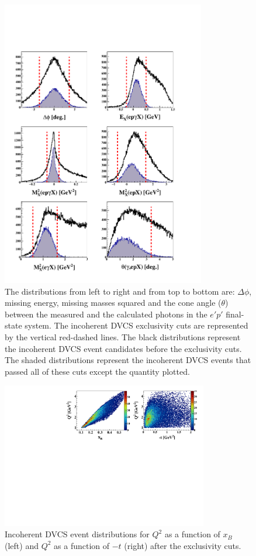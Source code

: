 \documentclass[twocolumn,nofootinbib,showpacs,prl,superscriptaddress,secnumarabic,amssymb,nobibnotes,aps,floatfix]{revtex4}
\begin{document}
\begin{figure}[tb]
\includegraphics[width=8.9cm]{figs/incoh_exc_cuts_final.pdf}
\caption{The distributions from left to right and from top to bottom are: 
   $\Delta \phi$, missing energy, missing masses squared and the cone angle 
   ($\theta$) between the measured and the calculated photons in the $e'p'$ 
   final-state system. The incoherent DVCS exclusivity cuts are represented by 
   the vertical red-dashed lines. The black distributions represent the 
   incoherent DVCS event candidates before the exclusivity cuts. The shaded 
   distributions represent the incoherent DVCS events that passed all of these 
   cuts except the quantity plotted.}
\label{fig:kin-cuts}

\end{figure}
\begin{figure}[h!]
\hspace{-0.45cm}
\includegraphics[width=9.0cm]{figs/Q2_xB_t_InCoh.pdf}
\caption{Incoherent DVCS event distributions for $Q^{2}$ as a function of 
$x_{B}$ (left) and $Q^{2}$ as a function of $-t$ (right) after the exclusivity 
cuts.}
\label{fig:kin-coverage}
\end{figure}
\end{document}
